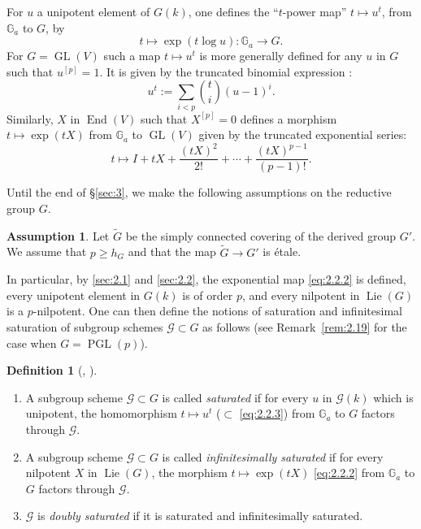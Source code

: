 \documentclass[11pt,a4paper]{article}
\theoremstyle{plain}
\theoremstyle{definition}
\newtheorem{definition}[theorem]{Definition}
\newtheorem{assumption}[theorem]{Assumption}
\DeclareMathOperator{\End}{End}
\DeclareMathOperator{\Lie}{Lie}
\DeclareMathOperator{\GL}{GL}
\DeclareMathOperator{\PGL}{PGL}
\newcommand{\G}{\mathbb{G}}
\begin{document}
For $u$ a unipotent element of $G(k)$, one defines the ``$t$-power map'' $t \mapsto u^t$, from $\G_a$ to $G$, by
\begin{equation} \label{eq:2.2.3}
t \mapsto \exp(t \log u) : \G_a \to G.
\end{equation}
For $G = \GL(V)$ such a map $t \mapsto u^t$ is more generally defined for any $u$ in $G$ such that $u^{[p]} = 1$. It is given by the truncated binomial expression \cite[4.1.1, page~524]{S1}:
\begin{equation} \label{eq:2.2.4}
u^t := \sum_{i < p} \binom{t}{i} (u - 1)^i.
\end{equation}
Similarly, $X$ in $\End(V)$ such that $X^{[p]} = 0$ defines a morphism $t \mapsto \exp(tX)$ from $\G_a$ to $\GL(V)$ given by the truncated exponential series:
\begin{equation} \label{eq:2.2.5}
t \mapsto I + tX + \frac{(tX)^2}{2!} + \cdots + \frac{(tX)^{p-1}}{(p-1)!}.
\end{equation}

Until the end of \S\ref{sec:3}, we make the following assumptions on the reductive group $G$.

\begin{assumption} \label{ass:2.3}
Let $\tilde{G}$ be the simply connected covering of the derived group $G'$. We assume that $p \geq h_G$ and that the map $\tilde{G} \to G'$ is \'etale.
\end{assumption}

In particular, by \ref{sec:2.1} and \ref{sec:2.2}, the exponential map \eqref{eq:2.2.2} is defined, every unipotent element in $G(k)$ is of order $p$, and every nilpotent in $\Lie(G)$ is a $p$-nilpotent. One can then define the notions of saturation and infinitesimal saturation of subgroup schemes $\mathcal{G} \subset G$ as follows (see Remark~\ref{rem:2.19} for the case when $G = \PGL(p)$).

\begin{definition}[{\cite[\S4]{S1}, \cite[Definition~1.5]{D}}] \label{def:2.4}
\leavevmode
\begin{enumerate}
\item A subgroup scheme $\mathcal{G} \subset G$ is called \emph{saturated} if for every $u$ in $\mathcal{G}(k)$ which is unipotent, the homomorphism $t \mapsto u^t$ ($\subset$ \eqref{eq:2.2.3}) from $\G_a$ to $G$ factors through $\mathcal{G}$.
\item A subgroup scheme $\mathcal{G} \subset G$ is called \emph{infinitesimally saturated} if for every nilpotent $X$ in $\Lie(G)$, the morphism $t \mapsto \exp(tX)$ \eqref{eq:2.2.2} from $\G_a$ to $G$ factors through $\mathcal{G}$.
\item $\mathcal{G}$ is \emph{doubly saturated} if it is saturated and infinitesimally saturated.
\end{enumerate}
\end{definition}
\end{document}
